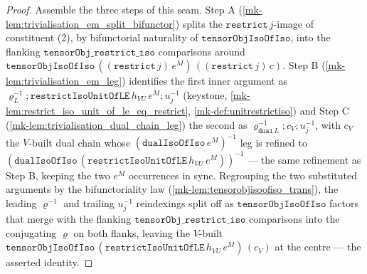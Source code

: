 \begin{proof}
  \leanok
  Assemble the three steps of this seam. Step A (\ref{mk-lem:trivialisation_em_split_bifunctor}) splits the
  \(\mathtt{restrict}\,j\)-image of constituent (2), by bifunctorial naturality of
  \(\mathtt{tensorObjIsoOfIso}\), into the flanking \(\mathtt{tensorObj\_restrict\_iso}\) comparisons
  around \(\mathtt{tensorObjIsoOfIso}\,((\mathtt{restrict}\,j)\,e^M)\,((\mathtt{restrict}\,j)\,c)\). Step B
  (\ref{mk-lem:trivialisation_em_leg}) identifies the first inner argument as
  \(\varrho_L^{-1} \mathbin{;} \mathtt{restrictIsoUnitOfLE}\,h_{VU}\,e^M \mathbin{;} u_j^{-1}\) (keystone,
  \ref{mk-lem:restrict_iso_unit_of_le_eq_restrict}, \ref{mk-def:unitrestrictiso}) and Step C
  (\ref{mk-lem:trivialisation_dual_chain_leg}) the second as
  \(\varrho_{\mathtt{dual}\,L}^{-1} \mathbin{;} c_V \mathbin{;} u_j^{-1}\), with \(c_V\) the \(V\)-built dual
  chain whose \((\mathtt{dualIsoOfIso}\,e^M)^{-1}\) leg is refined to
  \((\mathtt{dualIsoOfIso}\,(\mathtt{restrictIsoUnitOfLE}\,h_{VU}\,e^M))^{-1}\) --- the same refinement as
  Step B, keeping the two \(e^M\) occurrences in sync. Regrouping the two substituted arguments by the
  bifunctoriality law (\ref{mk-lem:tensorobjisoofiso_trans}), the leading \(\varrho^{-1}\) and trailing
  \(u_j^{-1}\) reindexings split off as \(\mathtt{tensorObjIsoOfIso}\) factors that merge with the flanking
  \(\mathtt{tensorObj\_restrict\_iso}\) comparisons into the conjugating \(\varrho\) on both flanks,
  leaving the \(V\)-built \(\mathtt{tensorObjIsoOfIso}\,(\mathtt{restrictIsoUnitOfLE}\,h_{VU}\,e^M)\,(c_V)\)
  at the centre --- the asserted identity.
\end{proof}


